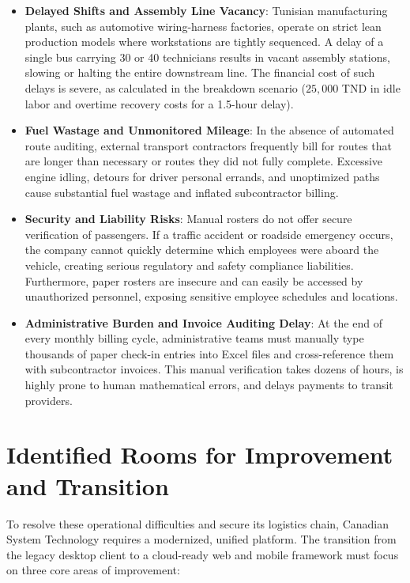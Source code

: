 \begin{itemize}
  \item \textbf{Delayed Shifts and Assembly Line Vacancy}: Tunisian manufacturing plants, such as automotive wiring-harness factories, operate on strict lean production models where workstations are tightly sequenced. A delay of a single bus carrying 30 or 40 technicians results in vacant assembly stations, slowing or halting the entire downstream line. The financial cost of such delays is severe, as calculated in the breakdown scenario ($25,000$ TND in idle labor and overtime recovery costs for a 1.5-hour delay).
  \item \textbf{Fuel Wastage and Unmonitored Mileage}: In the absence of automated route auditing, external transport contractors frequently bill for routes that are longer than necessary or routes they did not fully complete. Excessive engine idling, detours for driver personal errands, and unoptimized paths cause substantial fuel wastage and inflated subcontractor billing.
  \item \textbf{Security and Liability Risks}: Manual rosters do not offer secure verification of passengers. If a traffic accident or roadside emergency occurs, the company cannot quickly determine which employees were aboard the vehicle, creating serious regulatory and safety compliance liabilities. Furthermore, paper rosters are insecure and can easily be accessed by unauthorized personnel, exposing sensitive employee schedules and locations.
  \item \textbf{Administrative Burden and Invoice Auditing Delay}: At the end of every monthly billing cycle, administrative teams must manually type thousands of paper check-in entries into Excel files and cross-reference them with subcontractor invoices. This manual verification takes dozens of hours, is highly prone to human mathematical errors, and delays payments to transit providers.
\end{itemize}

\section{Identified Rooms for Improvement and Transition}

To resolve these operational difficulties and secure its logistics chain, Canadian System Technology requires a modernized, unified platform. The transition from the legacy desktop client to a cloud-ready web and mobile framework must focus on three core areas of improvement:

